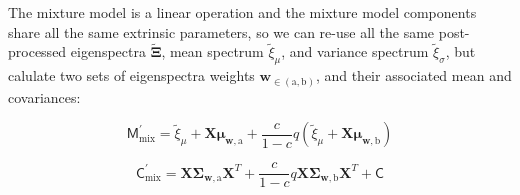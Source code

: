 \documentclass[onecolumn]{emulateapj}%
\begin{document}
The mixture model is a linear operation and the mixture model components share all the same extrinsic parameters, so we can re-use all the same post-processed eigenspectra $\widetilde{\mathbf{\Xi}}$, mean spectrum $\widetilde{\xi}_\mu$, and variance spectrum $\widetilde{\xi}_\sigma$, but calulate two sets of eigenspectra weights $\mathbf{w}_{\in (\mathrm{a}, \mathrm{b})}$, and their associated mean and covariances:

\begin{equation}
  \mathsf{M}_{\mathrm{mix}}^\prime = \widetilde{\xi}_\mu + \mathbf{X} \mathbf{\mu}_{\mathbf{w}, \mathrm{a}} + \frac{c}{1-c} q (\widetilde{\xi}_\mu + \mathbf{X} \mathbf{\mu}_{\mathbf{w}, \mathrm{b}})
\end{equation}

\begin{equation}
  \mathsf{C}_{\mathrm{mix}}^\prime = \mathbf{X} \mathbf{\Sigma}_\mathbf{w, \mathrm{a}} \mathbf{X}^T + \frac{c}{1-c} q \mathbf{X} \mathbf{\Sigma}_\mathbf{w, \mathrm{b}} \mathbf{X}^T + \mathsf{C}
  \label{eqn:modC}
\end{equation}
\end{document}
